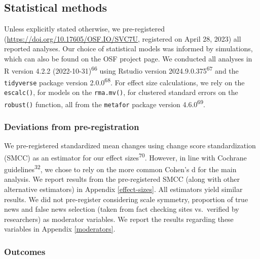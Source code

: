 \documentclass[
  man]{apa6}
\begin{document}
\subsection{Statistical methods}\label{statistical-methods}

Unless explicitly stated otherwise, we pre-registered (\url{https://doi.org/10.17605/OSF.IO/SVC7U}, registered on April 28, 2023) all reported analyses. Our choice of statistical models was informed by simulations, which can also be found on the OSF project page. We conducted all analyses in R version 4.2.2 (2022-10-31)\textsuperscript{66} using Rstudio version 2024.9.0.375\textsuperscript{67} and the \texttt{tidyverse} package version 2.0.0\textsuperscript{68}. For effect size calculations, we rely on the \texttt{escalc()}, for models on the \texttt{rma.mv()}, for clustered standard errors on the \texttt{robust()} function, all from the \texttt{metafor} package version 4.6.0\textsuperscript{69}.

\subsubsection{Deviations from pre-registration}\label{deviations-from-pre-registration}

We pre-registered standardized mean changes using change score standardization (SMCC) as an estimator for our effect sizes\textsuperscript{70}. However, in line with Cochrane guidelines\textsuperscript{32}, we chose to rely on the more common Cohen's d for the main analysis. We report results from the pre-registered SMCC (along with other alternative estimators) in Appendix \ref{effect-sizes}. All estimators yield similar results. We did not pre-register considering scale symmetry, proportion of true news and false news selection (taken from fact checking sites vs.~verified by researchers) as moderator variables. We report the results regarding these variables in Appendix \ref{moderators}.

\subsubsection{Outcomes}\label{outcomes}
\end{document}

